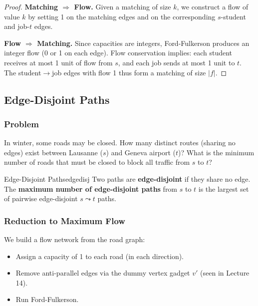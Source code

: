 \begin{proof}
\textbf{Matching $\Rightarrow$ Flow.} Given a matching of size $k$, 
we construct a flow of value $k$ by setting 1 on the matching edges and 
on the corresponding $s$-student and job-$t$ edges.

\textbf{Flow $\Rightarrow$ Matching.} Since capacities are integers, 
Ford-Fulkerson produces an integer flow (0 or 1 on each edge). 
Flow conservation implies: each student receives at most 1 unit of flow 
from $s$, and each job sends at most 1 unit to $t$. The student$\to$job 
edges with flow 1 thus form a matching of size $|f|$.
\end{proof}

\subsection{Edge-Disjoint Paths}

\subsubsection{Problem}

In winter, some roads may be closed. How many distinct routes 
(sharing no edges) exist between Lausanne ($s$) and Geneva airport ($t$)? 
What is the minimum number of roads that must be closed to block 
all traffic from $s$ to $t$?

\begin{definition}{Edge-Disjoint Paths}{edgedisj}
Two paths are \textbf{edge-disjoint} if they share no edge. 
The \textbf{maximum number of edge-disjoint paths} from $s$ to $t$ is the 
largest set of pairwise edge-disjoint $s \leadsto t$ paths.
\end{definition}

\subsubsection{Reduction to Maximum Flow}

We build a flow network from the road graph:
\begin{itemize}[noitemsep]
  \item Assign a capacity of 1 to each road (in each direction).
  \item Remove anti-parallel edges via the dummy vertex gadget $v'$ 
        (seen in Lecture 14).
  \item Run Ford-Fulkerson.
\end{itemize}

